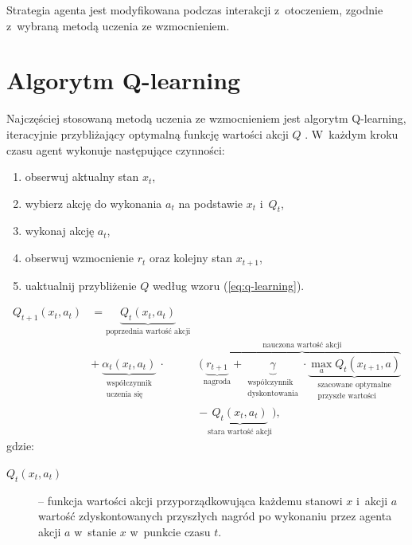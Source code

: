 \documentclass[a4paper, 12pt, oneside]{report}
\begin{document}
Strategia agenta jest modyfikowana podczas interakcji z~otoczeniem, zgodnie z~wybraną metodą uczenia ze wzmocnieniem.

\section{Algorytm Q-learning}

Najczęściej stosowaną metodą uczenia ze wzmocnieniem jest algorytm Q-learning, iteracyjnie przybliżający optymalną funkcję wartości akcji $Q$ \cite{Cichosz00}. W~każdym kroku czasu agent wykonuje następujące czynności:
\begin{enumerate}
\item obserwuj aktualny stan $x_t$,
\item wybierz akcję do wykonania $a_t$ na podstawie $x_t$ i~$Q_t$,
\item wykonaj akcję $a_t$,
\item obserwuj wzmocnienie $r_t$ oraz kolejny stan $x_{t+1}$,
\item uaktualnij przybliżenie $Q$ według wzoru (\ref{eq:q-learning}).
\end{enumerate}

\begin{equation}
\label{eq:q-learning}
\begin{aligned}
Q_{t+1}(x_t, a_t) &= \underbrace{Q_t(x_t, a_t)}_{\text{poprzednia wartość akcji}}\\
                  &+\ \underbrace{\alpha_t(x_t, a_t)}_{\substack{\text{współczynnik} \\ \text{uczenia się}}}\ \cdot             &\Bigg(\overbrace{\underbrace{r_{t+1}}_{\text{nagroda}} + \underbrace{\gamma}_{\substack{\text{współczynnik} \\ \text{dyskontowania}}} \cdot \underbrace{\max_a Q_t(x_{t+1}, a)}_{\substack{\text{szacowane optymalne} \\ \text{przyszłe wartości}}}}^{\text{nauczona wartość akcji}}\\
                  &&-\underbrace{Q_t(x_t, a_t)}_{\text{stara wartość akcji}}\Bigg),
\end{aligned}
\end{equation}
gdzie:
\begin{description}
\item[$Q_t(x_t, a_t)$] -- funkcja wartości akcji przyporządkowująca każdemu stanowi $x$ i~akcji $a$ wartość zdyskontowanych przyszłych nagród po wykonaniu przez agenta akcji $a$ w~stanie $x$ w~punkcie czasu $t$.
\end{description}
\end{document}
